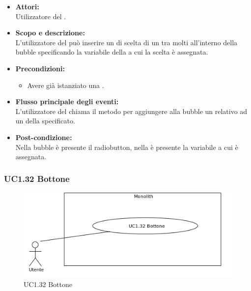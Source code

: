 \begin{itemize}
	\item \textbf{Attori:}
	\\Utilizzatore del .
	\item \textbf{Scopo e descrizione:} 
	\\L’utilizzatore del  può inserire un   di scelta di un  tra molti all’interno della bubble specificando la variabile della  a cui la scelta è assegnata.
	\item \textbf{Precondizioni:}
	\begin{itemize}
		\item Avere già istanziato una .
	\end{itemize}
	\item \textbf{Flusso principale degli eventi:}
	\\L’utilizzatore del  chiama il metodo per aggiungere alla bubble un  relativo ad un  della  specificato.
	\item \textbf{Post-condizione:}
	\\Nella bubble è presente il radiobutton, nella  è presente la variabile a cui è assegnata.
\end{itemize}

\subsubsection{UC1.32 Bottone} \label{UC1.32}

\begin{figure}[H]
	\centering
	\includegraphics[width=15cm]{../../documenti/AnalisiDeiRequisiti/Diagrammi_img/uc1_32.png}
	\caption{UC1.32 Bottone}
\end{figure}

